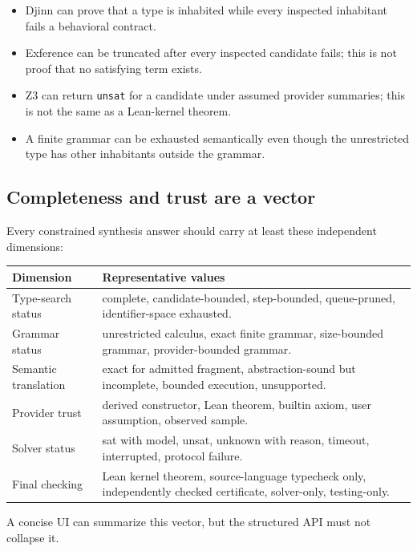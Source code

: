 \documentclass[11pt,oneside]{article}
\newcommand{\code}[1]{\texttt{#1}}
\begin{document}
\begin{itemize}
  \item Djinn can prove that a type is inhabited while every inspected inhabitant fails
        a behavioral contract.
  \item Exference can be truncated after every inspected candidate fails; this is not
        proof that no satisfying term exists.
  \item Z3 can return \code{unsat} for a candidate under assumed provider summaries;
        this is not the same as a Lean-kernel theorem.
  \item A finite grammar can be exhausted semantically even though the unrestricted
        type has other inhabitants outside the grammar.
\end{itemize}

\subsection{Completeness and trust are a vector}

Every constrained synthesis answer should carry at least these independent dimensions:

\begin{longtable}{@{}p{}p{}@{}}
\toprule
\textbf{Dimension} & \textbf{Representative values} \\
\midrule
\endhead
Type-search status & complete, candidate-bounded, step-bounded, queue-pruned,
identifier-space exhausted. \\
Grammar status & unrestricted calculus, exact finite grammar, size-bounded grammar,
provider-bounded grammar. \\
Semantic translation & exact for admitted fragment, abstraction-sound but incomplete,
bounded execution, unsupported. \\
Provider trust & derived constructor, Lean theorem, builtin axiom, user assumption,
observed sample. \\
Solver status & sat with model, unsat, unknown with reason, timeout, interrupted,
protocol failure. \\
Final checking & Lean kernel theorem, source-language typecheck only, independently
checked certificate, solver-only, testing-only. \\
\bottomrule
\end{longtable}

A concise UI can summarize this vector, but the structured API must not collapse it.
\end{document}
